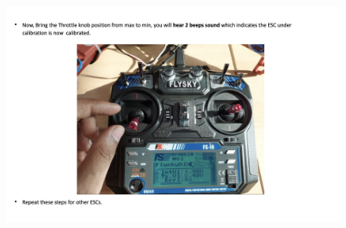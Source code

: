 \begin{figure}[h!]
\centering
\includegraphics[width=\columnwidth]{./Figures/config_img40.png}
\end{figure}



    
    